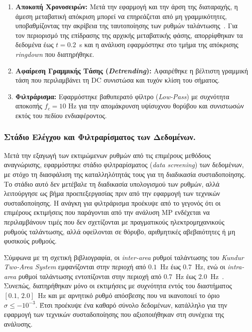 \begin{enumerate}
    \item \textbf{Αποκοπή Χρονοσειρών:} Μετά την εφαρμογή και την άρση της διαταραχής, η άμεση μεταβατική απόκριση μπορεί να επηρεάζεται από μη γραμμικότητες, υποβαθμίζοντας την ακρίβεια της ταυτοποίησης των ρυθμών ταλάντωσης~\cite{sfetkos2024measurement}. Για τον περιορισμό της επίδρασης της αρχικής μεταβατικής φάσης, απορρίφθηκαν τα δεδομένα έως $t=0.2$~s και η ανάλυση εφαρμόστηκε στο τμήμα της απόκρισης \textenglish{\textit{ringdown}} που διατηρήθηκε.
    \item \textbf{Αφαίρεση Γραμμικής Τάσης (\textenglish{\textit{Detrending}}):} Αφαιρέθηκε η βέλτιστη γραμμική τάση που περιλαμβάνει τη \textenglish{DC} συνιστώσα και τυχόν κλίση του σήματος.
    \item \textbf{Φιλτράρισμα:} Εφαρμόστηκε βαθυπερατό φίλτρο (\textenglish{\textit{Low-Pass}}) με συχνότητα αποκοπής $f_{c} = 10$ Hz για την απομάκρυνση υψίσυχνου θορύβου και συνιστωσών εκτός του πεδίου ενδιαφέροντος.
\end{enumerate}

\subsubsection{Στάδιο Ελέγχου και Φιλτραρίσματος των Δεδομένων.}
\label{subsec:data_screening}

Μετά την εξαγωγή των εκτιμώμενων ρυθμών από τις επιμέρους μεθόδους αναγνώρισης, εφαρμόστηκε στάδιο φιλτραρίσματος (\textenglish{\textit{data screening}}) των δεδομένων, με στόχο τη διασφάλιση της καταλληλότητάς τους για τη διαδικασία συσταδοποίησης. Το στάδιο αυτό δεν μετέβαλε τη διαδικασία υπολογισμού των ρυθμών, αλλά λειτούργησε ως βήμα προεπεξεργασίας πριν από την εφαρμογή των τεχνικών συσταδοποίησης. Η ανάγκη για φιλτράρισμα προέκυψε από το γεγονός ότι οι επιμέρους εκτιμήσεις που παράγονται από την ανάλυση MP ενδέχεται να περιλαμβάνουν τιμές που δεν σχετίζονται με πραγματικούς ηλεκτρομηχανικούς ρυθμούς ταλάντωσης, αλλά οφείλονται σε θόρυβο, αριθμητικές αβεβαιότητες ή μη φυσικούς ρυθμούς.

Σύμφωνα με τη σχετική βιβλιογραφία, οι \textenglish{\textit{inter-area}} ρυθμοί ταλάντωσης του \textenglish{\textit{Kundur Two-Area System}} εμφανίζονται στην περιοχή από $0.1$~Hz έως $0.7$~Hz, ενώ οι \textenglish{\textit{intra-area}} ρυθμοί ταλάντωσης εντοπίζονται στην περιοχή από $0.7$~Hz έως $2.0$~Hz~\cite{estimation2021}. Συνεπώς, διατηρήθηκαν μόνο οι εκτιμήσεις με συχνότητα εντός του διαστήματος $[0.1,\,2.0]$~Hz και με αρνητικό ρυθμό απόσβεσης που να ικανοποιεί το όριο $\sigma \leq -10^{-3}$. Έτσι προέκυψε ένα καθαρό σύνολο δεδομένων, κατάλληλο για την εφαρμογή των τεχνικών συσταδοποίησης που αξιοποιήθηκαν στη συνέχεια της ανάλυσης.

